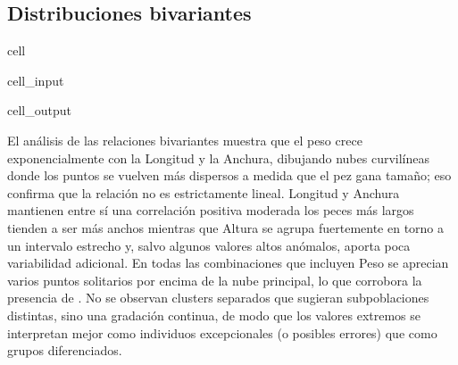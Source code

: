 \documentclass[a4paper,10pt,spanish]{jupyterBook}
\begin{document}
\subsection{Distribuciones bivariantes}
\label{\detokenize{content/02/Dataset:distribuciones-bivariantes}}
\begin{sphinxuseclass}{cell}\begin{sphinxVerbatimInput}

\begin{sphinxuseclass}{cell_input}
\begin{sphinxVerbatim}[commandchars=\\\{\}]
\PYG{p}{[}\PYG{p}{]} 
 
\end{sphinxVerbatim}

\end{sphinxuseclass}\end{sphinxVerbatimInput}
\begin{sphinxVerbatimOutput}

\begin{sphinxuseclass}{cell_output}
\noindent{}

\end{sphinxuseclass}\end{sphinxVerbatimOutput}

\end{sphinxuseclass}
\sphinxAtStartPar
El análisis de las relaciones bivariantes muestra que el peso crece exponencialmente con la Longitud y la Anchura, dibujando nubes curvilíneas donde los puntos se vuelven más dispersos a medida que el pez gana tamaño; eso confirma que la relación no es estrictamente lineal. Longitud y Anchura mantienen entre sí una correlación positiva moderada los peces más largos tienden a ser más anchos mientras que Altura se agrupa fuertemente en torno a un intervalo estrecho y, salvo algunos valores altos anómalos, aporta poca variabilidad adicional. En todas las combinaciones que incluyen Peso se aprecian varios puntos solitarios por encima de la nube principal, lo que corrobora la presencia de . No se observan clusters separados que sugieran sub\sphinxhyphen{}poblaciones distintas, sino una gradación continua, de modo que los valores extremos se interpretan mejor como individuos excepcionales (o posibles errores) que como grupos diferenciados.
\end{document}
